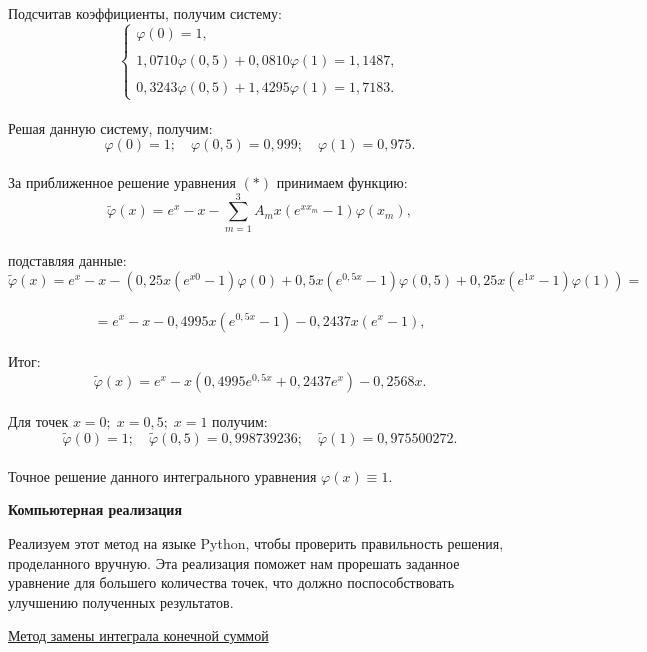 \documentclass[12pt]{article}
\begin{document}
Подсчитав коэффициенты, получим систему:\\
\begin{equation*}
\begin{cases}
\varphi(0) = 1, \\ 
\\
1,0710\varphi(0,5) + 0,0810\varphi(1) = 1,1487 ,  \\
\\
0,3243\varphi(0,5) + 1,4295\varphi(1) = 1,7183. 
\end{cases}
\end{equation*}\\
Решая данную систему, получим:\\
$$ \varphi(0) = 1; \quad \varphi(0,5) = 0,999; \quad \varphi(1) = 0,975 . $$\\
За приближенное решение уравнения $ (\ast) $ принимаем функцию:\\
$$ \tilde{\varphi}(x) = e^x - x - \sum\limits_{m=1}^3 A_mx(e^{xx_m}-1)\varphi(x_m) , $$\\
подставляя данные:\\
$$ \tilde{\varphi}(x) = e^x - x - (0,25x(e^{x0}-1)\varphi(0)+0,5x(e^{0,5x}-1)\varphi(0,5)+0,25x(e^{1x}-1)\varphi(1)) = $$\\
$$=  e^x - x - 0,4995x(e^{0,5x}-1)- 0,2437x(e^x - 1) , $$\\
Итог:\\
$$ \tilde{\varphi}(x) = e^x - x(0,4995e^{0,5x} + 0,2437e^x) - 0,2568x . $$\\
Для точек $ x = 0; \; x = 0,5; \; x =1 $ получим:\\
$$ \tilde{\varphi}(0) = 1; \quad  \tilde{\varphi}(0,5) = 0,998739236; \quad \tilde{\varphi}(1) = 0,975500272 . $$\\
Точное решение данного интегрального уравнения $ \varphi(x) \equiv 1 . $ \\
\newpage
\begin{center}
	\textbf{Компьютерная реализация}
\end{center}

Реализуем этот метод на языке Python, чтобы проверить правильность решения, проделанного вручную. Эта реализация поможет нам прорешать заданное уравнение для большего количества точек, что должно поспособствовать улучшению полученных результатов.\\

\begin{center}
	\underline{Метод замены интеграла конечной суммой}
\end{center}
\end{document}
